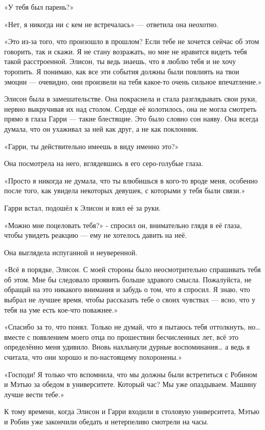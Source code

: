 \documentclass[a5paper, 9pt,
final, openany, twoside=true]{memoir}
\begin{document}
«У тебя был парень?»

«Нет, я никогда ни с кем не встречалась» — ответила она неохотно.

«Это из-за того, что произошло в прошлом? Если тебе не хочется сейчас об этом говорить, так и скажи. Я не стану возражать, но мне не нравится видеть тебя такой расстроенной. Элисон, ты ведь знаешь, что я люблю тебя и не хочу торопить. Я понимаю, как все эти события должны были повлиять на твои эмоции — очевидно, они произвели на тебя какое-то очень сильное впечатление.»

Элисон была в замешательстве. Она покраснела и стала разглядывать свои руки, нервно выкручивая их над столом. Сердце её колотилось, она не могла смотреть прямо в глаза Гарри — такие блестящие. Это было словно сон наяву. Она всегда думала, что он ухаживал за ней как друг, а не как поклонник.

«Гарри, ты действительно имеешь в виду именно это?»

Она посмотрела на него, вглядевшись в его серо-голубые глаза.

«Просто я никогда не думала, что ты влюбишься в кого-то вроде меня, особенно после того, как увидела некоторых девушек, с которыми у тебя были связи.»

Гарри встал, подошёл к Элисон и взял её за руки.

«Можно мне поцеловать тебя?» - спросил он, внимательно глядя в её глаза, чтобы увидеть реакцию — ему не хотелось давить на неё.

Она выглядела испуганной и неуверенной.

«Всё в порядке, Элисон. С моей стороны было неосмотрительно спрашивать тебя об этом. Мне бы следовало проявить больше здравого смысла. Пожалуйста, не обращай на это никакого внимания и забудь о том, что я спросил. Я знаю, что выбрал не лучшее время, чтобы рассказать тебе о своих чувствах — ясно, что у тебя на уме есть кое-что поважнее.»

«Спасибо за то, что понял. Только не думай, что я пытаюсь тебя оттолкнуть, но… вместе с появлением моего отца по прошествии бесчисленных лет, всё это определённо меня удивило. Вновь нахлынули дурные воспоминания… а ведь я считала, что они хорошо и по-настоящему похоронены.»

«Господи! Я только что вспомнила, что мы должны были встретиться с Робином и Мэтью за обедом в университете. Который час? Мы уже опаздываем. Машину лучше вести тебе.»\bigskip

К тому времени, когда Элисон и Гарри входили в столовую университета, Мэтью и Робин уже закончили обедать и нетерпеливо смотрели на часы.
\end{document}
